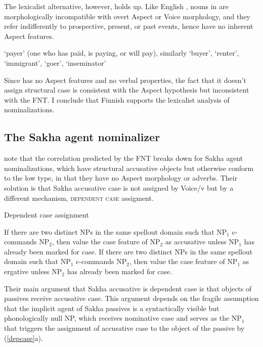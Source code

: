 \documentclass[output=paper,
modfonts
]{LSP/langsci}
\newcommand{\rfa}[2]{(\ref{#1}{#2})}
\begin{document}
The lexicalist alternative, however, holds up.  Like English , nouns in
 are morphologically incompatible with overt Aspect or Voice morphology, and
 they refer indifferently to prospective, present, or past events, hence
have no inherent Aspect features.
\begin{exe}
\ex
   `payer' (one who has paid, is paying, or will pay), similarly
   `buyer',  `renter',  `immigrant',
  `goer',  `inseminator'
\end{exe} 
Since  has no Aspect features and no verbal properties, the fact that it
doesn't assign structural case is consistent with the Aspect hypothesis but
inconsistent with the FNT.  I conclude that Finnish  supports the lexicalist
analysis of nominalizations.

\subsection{The Sakha agent nominalizer }

\citet[536]{baker2009} note that the correlation predicted by the FNT breaks down for Sakha agent
nominalizations, which have structural accusative objects but otherwise conform to the low
type, in that they have no Aspect morphology or adverbs.  Their solution is that Sakha
accusative case is not assigned by Voice/v but by a different mechanism, \textsc{dependent
  case} assigment.
\begin{exe}
\ex\label{depcase}
{Dependent case assignment}  \citep{marantz1991,baker2015}

\ea If there are two distinct NPs in the same spellout domain such that NP$_{1}$ c-commands NP$_{2}$,
  then value the case feature of NP$_{2}$ as accusative unless NP$_{1}$ has already been marked for case.
\ex If there are two distinct NPs in the same spellout domain such that NP$_{1}$ c-commands NP$_{2}$,
  then value the case feature of NP$_{1}$ as ergative unless NP$_{2}$ has already been marked for case.
 \z 
\end{exe}
Their main argument that Sakha accusative is dependent case is that objects of passives receive
accusative case.  This argument depends on the fragile assumption that the implicit agent of
Sakha passives is a syntactically visible but phonologically null NP, which receives nominative
case and serves as the NP$_{1}$ that triggers the assignment of accusative case to the object of the
passive by \rfa{depcase}{a}.
\end{document}
